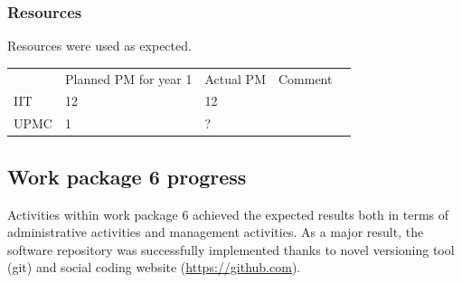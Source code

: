 \documentclass[12pt,a4paper,twoside]{article}
\begin{document}

\subsubsection{Resources}

Resources were used as expected.

\begin{center}
\begin{tabular}{|l|l|l|l|l}
\cline{1-4}
 & Planned PM for year 1 & Actual PM & Comment & \\ \cline{1-4}
IIT & 12 & 12 &  &  \\ \cline{1-4}
UPMC & 1 & ? &  &  \\ \cline{1-4}
\end{tabular}
\end{center}

\subsection{Work package 6 progress}

Activities within work package 6 achieved the expected results both in terms of administrative activities and management activities. As a major result, the software repository was successfully implemented thanks to novel versioning tool (git) and social coding website (\url{https://github.com}).
\end{document}
